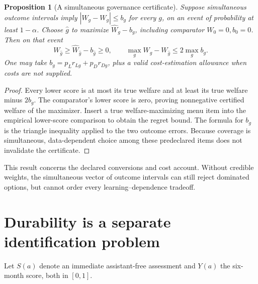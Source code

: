 \documentclass[11pt]{article}
\newtheorem{proposition}[theorem]{Proposition}
\theoremstyle{remark}
\begin{document}
\begin{proposition}[A simultaneous governance certificate]
Suppose simultaneous outcome intervals imply $|\widehat W_g-W_g|\le b_g$ for every $g$, on an event of probability at least $1-\alpha$. Choose $\widehat g$ to maximize $\widehat W_g-b_g$, including comparator $W_0=0,b_0=0$. Then on that event
\[
 W_{\widehat g}\ge\widehat W_{\widehat g}-b_{\widehat g}\ge0,
 \qquad \max_gW_g-W_{\widehat g}\le2\max_g b_g.
\]
One may take $b_g=p_Lr_{Lg}+p_Dr_{Dg}$, plus a valid cost-estimation allowance when costs are not supplied.
\end{proposition}
\begin{proof}
Every lower score is at most its true welfare and at least its true welfare minus $2b_g$. The comparator's lower score is zero, proving nonnegative certified welfare of the maximizer. Insert a true welfare-maximizing menu item into the empirical lower-score comparison to obtain the regret bound. The formula for $b_g$ is the triangle inequality applied to the two outcome errors. Because coverage is simultaneous, data-dependent choice among these predeclared items does not invalidate the certificate.
\end{proof}
This result concerns the declared conversions and cost account. Without credible weights, the simultaneous vector of outcome intervals can still reject dominated options, but cannot order every learning--dependence tradeoff.

\section*{Durability is a separate identification problem}
Let $S(a)$ denote an immediate assistant-free assessment and $Y(a)$ the six-month score, both in $[0,1]$.
\end{document}

